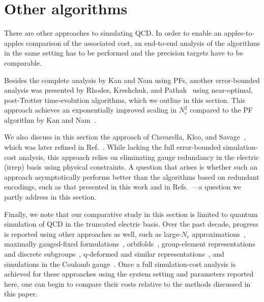 \documentclass[aps,prd,twocolumn,showpacs,groupedaddress,superscriptaddress,nofootinbib,floatfix,preprintnumbers,longbibliography]{revtex4-1}
\begin{document}
\section{Other algorithms
\label{sec:others}
}
There are other approaches to simulating QCD. In order to enable an apples-to-apples comparison of the associated cost, an end-to-end analysis of the algorithms in the same setting has to be performed and the precision targets have to be comparable.

Besides the complete analysis by Kan and Nam using PFs, another error-bounded analysis was presented by Rhodes, Kreshchuk, and Pathak~\cite{Rhodes:2024zbr} using near-optimal, post-Trotter time-evolution algorithms, which we outline in this section. This approach achieves an exponentially improved scaling in $N_c^2$ compared to the PF algorithm by Kan and Nam~\cite{Kan:2021xfc}.

We also discuss in this section the approach of Ciavarella, Klco, and Savage~\cite{Ciavarella:2021nmj}, which was later refined in Ref.~\cite{Balaji:2025afl}. While lacking the full error-bounded simulation-cost analysis, this approach relies on eliminating gauge redundancy in the electric (irrep) basis using physical constraints. A question that arises is whether such an approach asymptotically performs better than the algorithms based on redundant encodings, such as that presented in this work and in Refs.~\cite{Kan:2021xfc,Rhodes:2024zbr}---a question we partly address in this section.

Finally, we note that our comparative study in this section is limited to quantum simulation of QCD in the truncated electric basis. Over the past decade, progress is reported using other approaches as well, such as large-$N_c$ approximations~\cite{Ciavarella:2024fzw,Ciavarella:2025bsg,Modi:2026syn}, maximally gauged-fixed formulations~\cite{Froland:2025bqf,Grabowska:2024emw}, orbifolds~\cite{Bergner:2024qjl,Halimeh:2024bth,Halimeh:2025ivn}, group-element representations~\cite{Lamm:2019bik,Haase:2020kaj,Bauer:2021gek} and discrete subgroups~\cite{Lamm:2024jnl,Gustafson:2022xdt,Perez:2025cxl}, q-deformed and similar representations~\cite{Zache:2023dko,Rhodes:2026atz,Webb-Mack:2026bkg}, and simulations in the Coulomb gauge~\cite{Li:2024ide,Yao:2025uxz}. Once a full simulation-cost analysis is achieved for these approaches using the system setting and parameters reported here, one can begin to compare their costs relative to the methods discussed in this paper.
\end{document}
